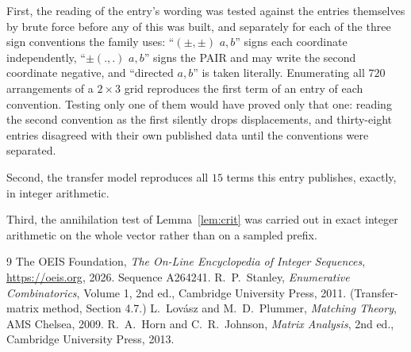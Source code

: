 \documentclass[11pt,a4paper]{article}
\theoremstyle{plain}
\theoremstyle{definition}
\begin{document}
First, the reading of the entry's wording was tested against the entries themselves by brute
force before any of this was built, and separately for each of the three sign conventions the
family uses: ``$(\pm,\pm)$ $a,b$'' signs each coordinate independently, ``$\pm(.,.)$ $a,b$''
signs the PAIR and may write the second coordinate negative, and ``directed $a,b$'' is taken
literally. Enumerating all $720$ arrangements of a $2\times3$ grid reproduces the first term
of an entry of each convention. Testing only one of them would have proved only that one:
reading the second convention as the first silently drops displacements, and thirty-eight
entries disagreed with their own published data until the conventions were separated.

Second, the transfer model reproduces all $15$ terms this entry publishes, exactly, in
integer arithmetic.

Third, the annihilation test of Lemma~\ref{lem:crit} was carried out in exact integer
arithmetic on the whole vector rather than on a sampled prefix.

\begin{thebibliography}{9}
 The OEIS Foundation, \emph{The On-Line Encyclopedia of Integer
Sequences}, \url{https://oeis.org}, 2026. Sequence A264241.
 R.~P.~Stanley, \emph{Enumerative Combinatorics}, Volume 1, 2nd ed.,
Cambridge University Press, 2011. (Transfer-matrix method, Section 4.7.)
 L.~Lov\'asz and M.~D.~Plummer, \emph{Matching Theory}, AMS Chelsea, 2009.
 R.~A.~Horn and C.~R.~Johnson, \emph{Matrix Analysis}, 2nd ed., Cambridge
University Press, 2013.
\end{thebibliography}
\end{document}
